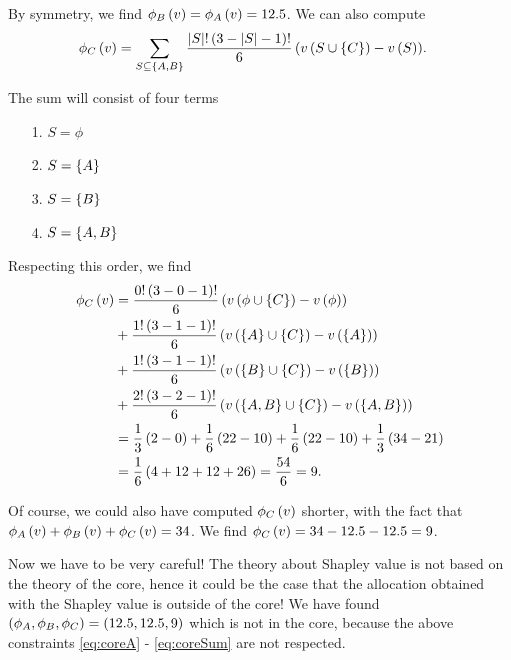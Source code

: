 \begin{enumerate} [label=\alph*.]
	By symmetry, we find $\phi_{B} \left(v\right) = \phi_{A} \left(v\right) = 12.5$. We can also compute
	\begin{align*}
	    \phi_{C} \left(v\right)
	    &= \sum_{S \subseteq \left\{A, B\right\}}{\dfrac{\left\lvert S\right\rvert! \left(3 - \left\lvert S\right\rvert - 1\right)!}{6} \left(v \left(S \cup \left\{C\right\}\right) - v \left(S\right)\right)}.
	\end{align*}
	
	The sum will consist of four terms
	\begin{enumerate}
	    \item[1.] $S = \phi$
	    \item[2.] $S = \left\{A\right\}$
	    \item[3.] $S = \left\{B\right\}$
	    \item[4.] $S = \left\{A, B\right\}$
	\end{enumerate}
	
	Respecting this order, we find
	\begin{align*}
	    \phi_{C} \left(v\right)
	    &= \dfrac{0! \left(3 - 0 - 1\right)!}{6} \left(v \left(\phi \cup \left\{C\right\}\right) - v \left(\phi\right)\right) \\
	    &+ \dfrac{1! \left(3 - 1 - 1\right)!}{6} \left(v \left(\left\{A\right\} \cup \left\{C\right\}\right) - v \left(\left\{A\right\}\right)\right) \\
	    &+ \dfrac{1! \left(3 - 1 - 1\right)!}{6} \left(v \left(\left\{B\right\} \cup \left\{C\right\}\right) - v \left(\left\{B\right\}\right)\right) \\
	    &+ \dfrac{2! \left(3 - 2 - 1\right)!}{6} \left(v \left(\left\{A, B\right\} \cup \left\{C\right\}\right) - v \left(\left\{A, B\right\}\right)\right) \\
	    &= \dfrac{1}{3} \left(2 - 0\right)
	    + \dfrac{1}{6} \left(22 - 10\right)
	    + \dfrac{1}{6} \left(22 - 10\right)
	    + \dfrac{1}{3} \left(34 - 21\right) \\
	    &= \dfrac{1}{6} \left(4 + 12 + 12 + 26\right)
	    = \dfrac{54}{6}
	    = 9.
	\end{align*}
	
	Of course, we could also have computed $\phi_{C} \left(v\right)$ shorter, with the fact that $\phi_{A} \left(v\right) + \phi_{B} \left(v\right) + \phi_{C} \left(v\right) = 34$. We find $\phi_{C} \left(v\right) = 34 - 12.5 - 12.5 = 9$.  
	
	
	\vspace{5mm}
	
	Now we have to be very careful! The theory about Shapley value is not based on the theory of the core, hence it could be the case that the allocation obtained with the Shapley value is outside of the core! We have found $\left(\phi_{A}, \phi_{B}, \phi_{C}\right) = \left(12.5, 12.5, 9\right)$ which is not in the core, because the above constraints \eqref{eq:coreA} - \eqref{eq:coreSum} are not respected. 
	
\end{enumerate}
